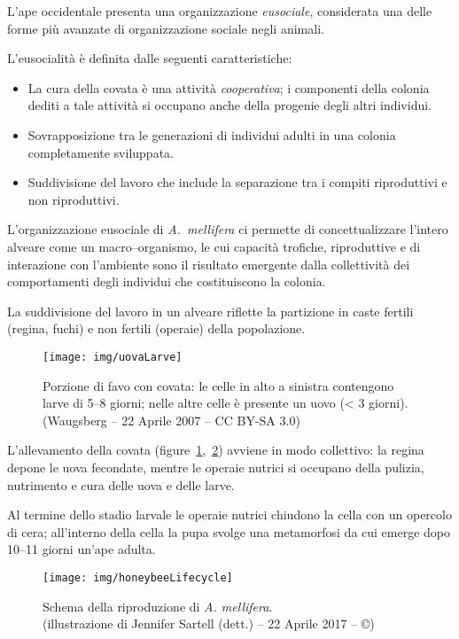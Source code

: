 L'ape occidentale presenta una organizzazione \emph{eusociale}, considerata una delle forme più
avanzate di organizzazione sociale negli animali.

L'eusocialità è definita dalle seguenti caratteristiche:
\begin{itemize}
    \item La cura della covata è una attività \emph{cooperativa}; i componenti della colonia dediti a tale attività si occupano anche della progenie degli altri individui.
    \item Sovrapposizione tra le generazioni di individui adulti in una colonia completamente sviluppata.
    \item Suddivisione del lavoro che include la separazione tra i compiti riproduttivi e non riproduttivi.
\end{itemize}

L'organizzazione eusociale di \emph{A.~mellifera} ci permette di concettualizzare l'intero alveare come un macro--organismo, le cui capacità trofiche, riproduttive e di interazione con l'ambiente sono il risultato emergente dalla collettività dei comportamenti degli individui che costituiscono la colonia.

La suddivisione del lavoro in un alveare riflette la partizione in caste fertili (regina, fuchi) e non fertili (operaie) della popolazione.

\begin{figure}[hbp]
    \centering
    \texttt{[image: img/uovaLarve]}

    \caption[Covata giovane.]{Porzione di favo con covata: le celle in alto a sinistra contengono larve di 5--8 giorni; nelle altre celle è presente un uovo (< 3 giorni). \\ (Waugsberg -- 22 Aprile 2007 -- CC BY-SA 3.0)}
    \label{img:uovaLarve}
\end{figure}

L'allevamento della covata (figure~\ref{img:uovaLarve},~\ref{img:lifecycle}) avviene in modo collettivo: la regina depone le uova fecondate, mentre le operaie nutrici si occupano della pulizia, nutrimento e cura delle uova e delle larve.

Al termine dello stadio larvale le operaie nutrici chiudono la cella con un opercolo di cera; all'interno della cella la pupa svolge una metamorfosi da cui emerge dopo 10--11 giorni un'ape adulta.

\begin{figure}[hbp]
    \centering
    \texttt{[image: img/honeybeeLifecycle]}

    \caption[Ciclo vitale dell'ape.]{Schema della riproduzione di \emph{A. mellifera}.
        \\ (illustrazione di Jennifer Sartell (dett.) -- 22 Aprile 2017 -- ©)}
    \label{img:lifecycle}
\end{figure}

